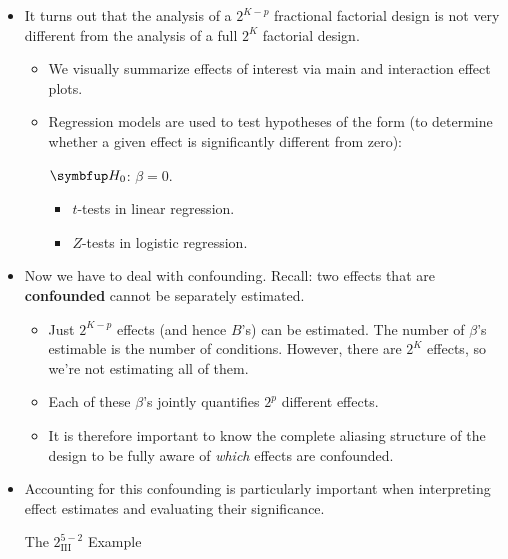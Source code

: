 \begin{itemize}
    \item It turns out that the analysis of a $ 2^{K-p} $ fractional factorial design is not very different from the analysis
          of a full $2^K$ factorial design.
          \begin{itemize}
              \item We visually summarize effects of interest via main and interaction effect plots.
              \item Regression models are used to test hypotheses of the form (to determine whether a given effect is significantly different from zero):
                    \begin{tightcenter}
                        $ \HN $: $ \beta=0 $.
                    \end{tightcenter}
                    \begin{itemize}[$\rightarrow$]
                        \item $ t $-tests in linear regression.
                        \item $ Z $-tests in logistic regression.
                    \end{itemize}
          \end{itemize}
    \item Now we have to deal with confounding. Recall: two effects that are \textbf{confounded} cannot be separately
          estimated.
          \begin{itemize}[$\rightarrow$]
              \item Just $ 2^{K-p} $ effects (and hence $ B $'s) can be estimated. The number of $ \beta $'s estimable is the number of conditions.
                    However, there are $ 2^K $ effects, so we're not estimating all of them.
              \item Each of these $ \beta $'s jointly quantifies $ 2^p $ different effects.
          \end{itemize}
          \begin{itemize}
              \item It is therefore important to know the complete aliasing structure of the design to be fully
                    aware of \emph{which} effects are confounded.
          \end{itemize}
    \item Accounting for this confounding is particularly important when interpreting effect estimates and evaluating their significance.
          \begin{Example}{The $ 2^{5-2}_{\text{III}} $ Example}{}

\end{Example}
\end{itemize}
